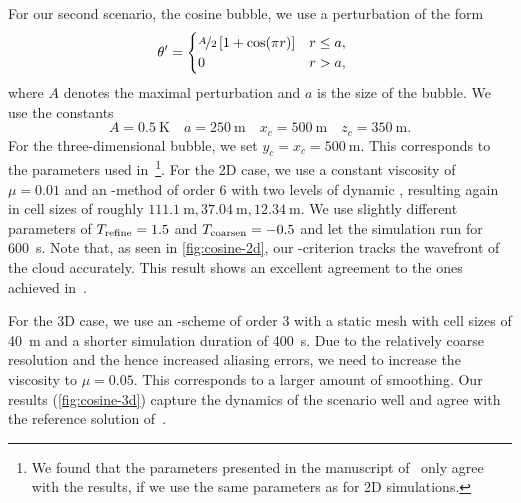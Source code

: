 \documentclass[runningheads]{llncs}
\begin{document}
For our second scenario, the cosine bubble, we use a perturbation of the form
\begin{align}
  \label{eq:cos-pertubation}
  \theta' &= \begin{cases}
    \nicefrac{A}{2} \left[ 1 + \cos(\pi r) \right] & r \leq a, \\
    0 & r > a,
    \end{cases}
\end{align}
where $A$ denotes the maximal perturbation and $a$ is the size of the bubble.
We use the constants
\begin{equation}\label{eq:cosine-bubble}
  A = \SI{0.5}{\K} \quad a = \SI{250}{\m} \quad x_c = \SI{500}{\m} \quad z_c = \SI{350}{\m}.
\end{equation}
For the three-dimensional bubble, we set $y_c = x_c = \SI{500}{\m}$.
This corresponds to the parameters used in~\cite{kelly2012continuous}\footnote{%
We found that the parameters presented in the manuscript of~\cite{kelly2012continuous} only agree with the results, if we use the same parameters as for 2D simulations.}.
For the 2D case, we use a constant viscosity of $\mu = 0.01$ and an \aderdg{}-method of order 6 with two levels of dynamic \amr{}, resulting again in cell sizes of roughly $\SI{111.1}{\m}, \SI{37.04}{\m}, \SI{12.34}{\m}$.
We use slightly different \amr{} parameters of $T_\text{refine} = 1.5$ and $T_\text{coarsen} = -0.5$ and let the simulation run for \SI{600}{\s}.
Note that, as seen in \cref{fig:cosine-2d}, our \amr{}-criterion tracks the wavefront of the cloud accurately.
This result shows an excellent agreement to the ones achieved in~\cite{giraldo2008study,muller2010adaptive}.

For the 3D case, we use an \aderdg{}-scheme of order 3 with a static mesh with cell sizes of \SI{40}{\m} and a shorter simulation duration of \SI{400}{\s}.
Due to the relatively coarse resolution and the hence increased aliasing errors, we need to increase the viscosity to $\mu = 0.05$.
This corresponds to a larger amount of smoothing.
Our results (\cref{fig:cosine-3d}) capture the dynamics of the scenario well and agree with the reference solution of~\cite{kelly2012continuous}.
\end{document}

